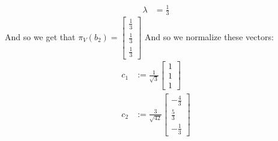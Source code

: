 \documentclass[final,expand]{problemset}
\begin{document}
{\begin{align*}
		\lambda &= \frac{1}{3}
	\end{align*}
	And so we get that $\pi_V(b_2) = \begin{bmatrix}
		\frac{1}{3} \\ \frac{1}{3}\\ \frac{1}{3}
	\end{bmatrix}$
	And so we normalize these vectors:
	\begin{align*}
		c_1 &:= \frac{1}{\sqrt{3}}\begin{bmatrix}
			1 \\ 1\\ 1
		\end{bmatrix}\\
		c_2 &:= \frac{3}{\sqrt{42}} \begin{bmatrix}
			-\frac{4}{3} \\ \frac{5}{3} \\ -\frac{1}{3}
		\end{bmatrix}
	\end{align*}

}
\end{document}
